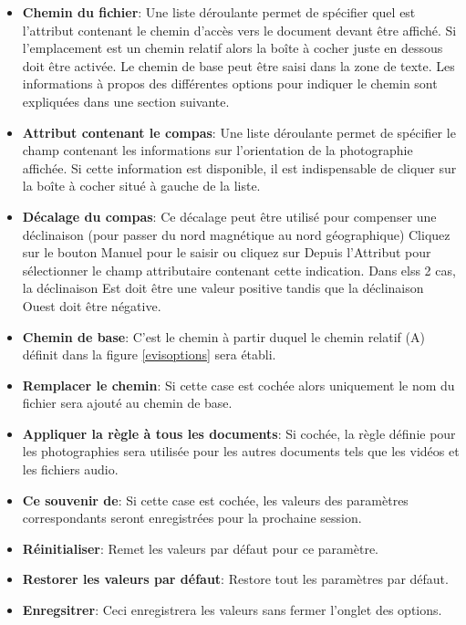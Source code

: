 \begin{itemize}
\item \textbf{Chemin du fichier}: Une liste déroulante permet de spécifier quel est l'attribut contenant le chemin d'accès vers le document devant être affiché. Si l'emplacement est un chemin relatif alors la boîte à cocher juste en dessous doit être activée. Le chemin de base peut être saisi dans la zone de texte. Les informations à propos des différentes options pour indiquer le chemin sont expliquées dans une section suivante.
\item \textbf{Attribut contenant le compas}: Une liste déroulante permet de spécifier le champ contenant les informations sur l'orientation de la photographie affichée. Si cette information est disponible, il est indispensable de cliquer sur la boîte à cocher situé à gauche de la liste.
\item \textbf{Décalage du compas}: Ce décalage peut être utilisé pour compenser une déclinaison (pour passer du nord magnétique au nord géographique) Cliquez sur le bouton Manuel pour le saisir  ou cliquez sur Depuis l'Attribut pour sélectionner le champ attributaire contenant cette indication. Dans elss 2 cas, la déclinaison Est doit être une valeur positive tandis que la déclinaison Ouest doit être négative.
\item \textbf{Chemin de base}: C'est le chemin à partir duquel le chemin relatif (A) définit dans la figure \ref{evisoptions} sera établi.
\item \textbf{Remplacer le chemin}: Si cette case est cochée alors uniquement le nom du fichier sera ajouté au chemin de base.
\item \textbf{Appliquer la règle à tous les documents}: Si cochée, la règle définie pour les photographies sera utilisée pour les autres documents tels que les vidéos et les fichiers audio.
\item \textbf{Ce souvenir de}: Si cette case est cochée, les valeurs des paramètres correspondants seront enregistrées pour la prochaine session.
\item \textbf{Réinitialiser}: Remet les valeurs par défaut pour ce paramètre.
\item \textbf{Restorer les valeurs par défaut}: Restore tout les paramètres par défaut.
\item \textbf{Enregsitrer}: Ceci enregistrera les valeurs sans fermer l'onglet des options.
\end{itemize}

\label{evis_external_window}

